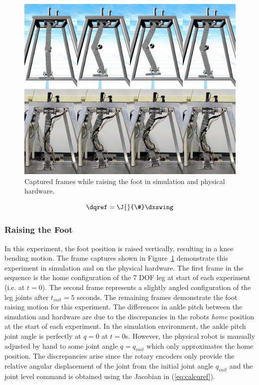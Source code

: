 \begin{figure}[!b]
	\centering
    \includegraphics[scale=0.35]{fig/experiments/kneebendframes.png} 
  	\caption{Captured frames while raising the foot in simulation and physical hardware.}
	\label{fig:kneebendframes}
\end{figure}

\begin{equation}
	\dqref = \J{}{\#} \dxswing
\end{equation}

\subsubsection{Raising the Foot} %
\label{ssub:knee_bending_motion}

In this experiment, the foot position is raised vertically, resulting in a knee bending motion. The frame captures shown in Figure~\ref{fig:kneebendframes} demonstrate this experiment in simulation and on the physical hardware. The first frame in the sequence is the home configuration of the 7 DOF leg at start of each experiment (i.e. at $t = 0$). The second frame represents a slightly angled configuration of the leg joints after $t_{init} = 5$ seconds. The remaining frames demonstrate the foot raising motion for this experiment. The differences in ankle pitch between the simulation and hardware are due to the discrepancies in the robots \emph{home} position at the start of each experiment. In the simulation environment, the ankle pitch joint angle is perfectly at $q = 0$ at $t = 0$s. However, the physical robot is manually adjusted by hand to some joint angle $q = q_{init}$ which only approximates the home position. The discrepancies arise since the rotary encoders only provide the relative angular displacement of the joint from the initial joint angle $q_{init}$ and the joint level command is obtained using the Jacobian in (\ref{eq:calcqref}). 

